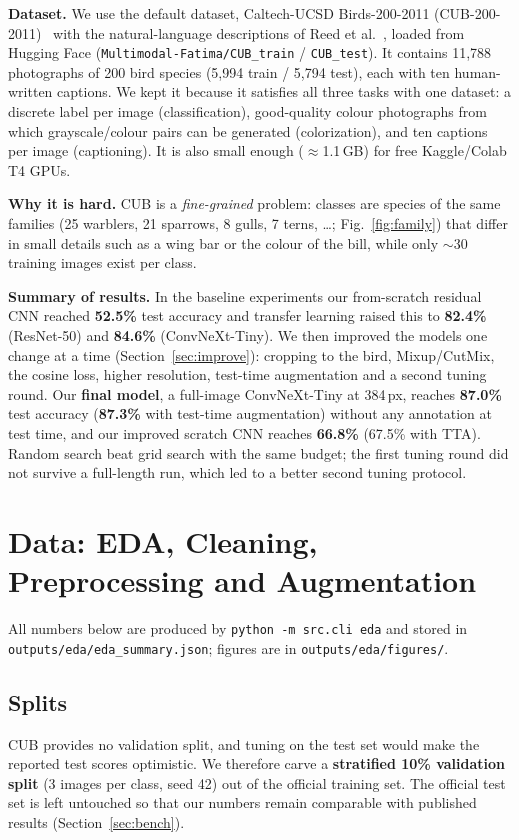 \documentclass[11pt,a4paper]{article}
\begin{document}
\textbf{Dataset.} We use the default dataset, Caltech-UCSD Birds-200-2011 (CUB-200-2011)~\cite{cub}
with the natural-language descriptions of Reed et al.~\cite{reed}, loaded from Hugging Face
(\texttt{Multimodal-Fatima/CUB\_train} / \texttt{CUB\_test}). It contains 11,788 photographs of 200
bird species (5,994 train / 5,794 test), each with ten human-written captions. We kept it because
it satisfies all three tasks with one dataset: a discrete label per image (classification), good-quality
colour photographs from which grayscale/colour pairs can be generated (colorization), and ten captions
per image (captioning). It is also small enough ($\approx$1.1\,GB) for free Kaggle/Colab T4 GPUs.

\textbf{Why it is hard.} CUB is a \emph{fine-grained} problem: classes are species of the same
families (25 warblers, 21 sparrows, 8 gulls, 7 terns, \dots; Fig.~\ref{fig:family}) that differ in small
details such as a wing bar or the colour of the bill, while only $\sim$30 training images exist per class.

\textbf{Summary of results.} In the baseline experiments our from-scratch residual CNN reached \textbf{52.5\%} test accuracy and
transfer learning raised this to \textbf{82.4\%} (ResNet-50) and \textbf{84.6\%} (ConvNeXt-Tiny). We then improved the models one
change at a time (Section~\ref{sec:improve}): cropping to the bird, Mixup/CutMix, the cosine loss, higher resolution, test-time
augmentation and a second tuning round. Our \textbf{final model}, a full-image ConvNeXt-Tiny at 384\,px, reaches \textbf{87.0\%}
test accuracy (\textbf{87.3\%} with test-time augmentation) without any annotation at test time, and our improved scratch CNN reaches
\textbf{66.8\%} (67.5\% with TTA). Random search beat grid search with the same budget; the first tuning round did not survive a
full-length run, which led to a better second tuning protocol.

\section{Data: EDA, Cleaning, Preprocessing and Augmentation}
All numbers below are produced by \texttt{python -m src.cli eda} and stored in
\texttt{outputs/eda/eda\_summary.json}; figures are in \texttt{outputs/eda/figures/}.

\subsection{Splits}
CUB provides no validation split, and tuning on the test set would make the reported test scores
optimistic. We therefore carve a \textbf{stratified 10\% validation split} (3 images per class,
seed 42) out of the official training set. The official test set is left untouched so that our numbers
remain comparable with published results (Section~\ref{sec:bench}).
\end{document}
